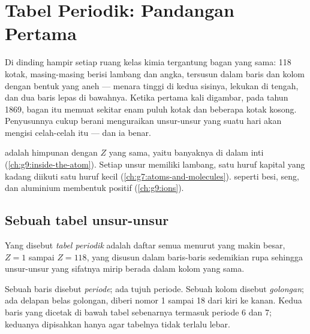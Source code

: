 \chapter{Tabel Periodik: Pandangan Pertama}\label{ch:g9:periodic-table-first-look}

Di dinding hampir setiap ruang kelas kimia tergantung bagan yang sama:
118 kotak, masing-masing berisi lambang dan angka, tersusun dalam baris
dan kolom dengan bentuk yang aneh --- menara tinggi di kedua sisinya,
lekukan di tengah, dan dua baris lepas di bawahnya. Ketika pertama kali
digambar, pada tahun 1869, bagan itu memuat sekitar enam puluh kotak dan
beberapa kotak kosong. Penyusunnya cukup berani menguraikan unsur-unsur
yang suatu hari akan mengisi celah-celah itu --- dan ia benar.

\begin{recall}
 adalah himpunan  dengan  $Z$ yang sama, yaitu
banyaknya  di dalam inti (\cref{ch:g9:inside-the-atom}). Setiap
unsur memiliki lambang, satu huruf kapital yang kadang diikuti satu
huruf kecil (\cref{ch:g7:atoms-and-molecules}).  seperti besi,
seng, dan aluminium membentuk  positif (\cref{ch:g9:ions}).
\end{recall}

\section{Sebuah tabel unsur-unsur}

\begin{definition}\label{def:g9:periodic-table-first-look:periodic-table}
Yang disebut \emph{tabel periodik} adalah daftar
semua  menurut  yang makin besar, $Z = 1$ sampai
$Z = 118$, yang disusun dalam baris-baris sedemikian rupa sehingga
unsur-unsur yang sifatnya mirip berada dalam kolom yang sama.
\end{definition}

\begin{definition}\label{def:g9:periodic-table-first-look:period}
Sebuah baris  disebut \emph{periode}; ada
tujuh periode. Sebuah kolom disebut \emph{golongan}; ada
delapan belas golongan, diberi nomor 1 sampai 18 dari kiri ke kanan.
Kedua baris yang dicetak di bawah tabel sebenarnya termasuk periode 6
dan 7; keduanya dipisahkan hanya agar tabelnya tidak terlalu lebar.
\end{definition}


